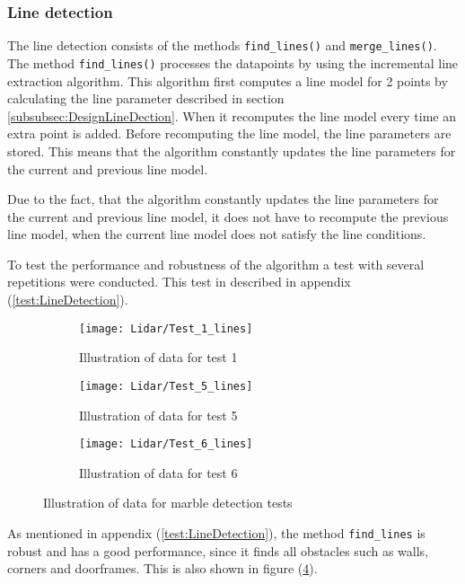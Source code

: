 \documentclass[../Head/Main.tex]{subfiles}
\begin{document}
\subsubsection{Line detection}
The line detection consists of the methods \texttt{find\_lines()} and \texttt{merge\_lines()}.\\
The method \texttt{find\_lines()} processes the datapoints by using the incremental line extraction algorithm. This algorithm first computes a line model for 2 points by calculating the line parameter described in section \ref{subsubsec:DesignLineDection}. When it recomputes the line model every time an extra point is added. Before recomputing the line model, the line parameters are stored. This means that the algorithm constantly updates the line parameters for the current and previous line model.\par
Due to the fact, that the algorithm constantly updates the line parameters for the current and previous line model, it does not have to recompute the previous line model, when the current line model does not satisfy the line conditions. \par
To test the performance and robustness of the algorithm a  test with several repetitions were conducted. This test in described in appendix (\ref{test:LineDetection}).
\begin{figure}[H]
  \begin{subfigure}[b]{0.3\textwidth}
  	\centering
    \texttt{[image: Lidar/Test\_1\_lines]}
    \caption{Illustration of data for test 1}
    \label{fig:LineTest1}
  \end{subfigure}
  \hfill
  \begin{subfigure}[b]{0.3\textwidth}
  	\centering
    \texttt{[image: Lidar/Test\_5\_lines]}
    \caption{Illustration of data for test 5}
    \label{fig:LineTest5}
  \end{subfigure}
  \hfill
  \begin{subfigure}[b]{0.3\textwidth}
    \centering
    \texttt{[image: Lidar/Test\_6\_lines]}
    \caption{Illustration of data for test 6}
    \label{fig:LineTest6}
  \end{subfigure}
  \caption{Illustration of data for marble detection tests}
  \label{fig:LineTests}
\end{figure}
As mentioned in appendix (\ref{test:LineDetection}), the method \texttt{find\_lines} is robust and has a good performance, since it finds all obstacles such as walls, corners and doorframes. This is also shown in figure (\ref{fig:LineTests}).\par
\end{document}
